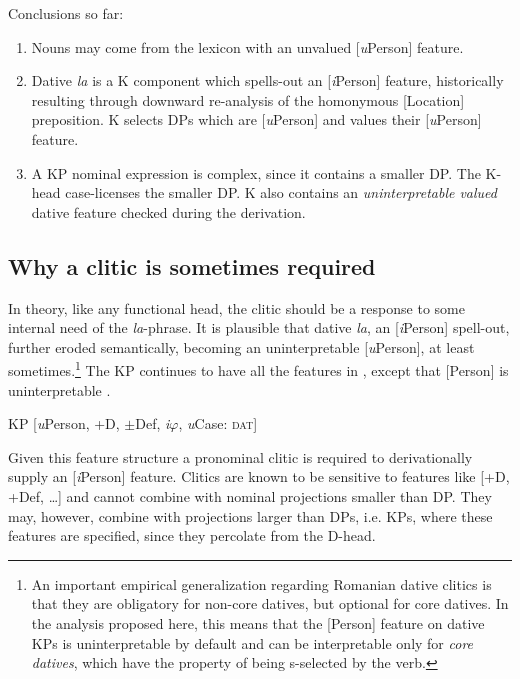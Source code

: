 \documentclass[output=paper,colorlinks,citecolor=brown,nonflat]{langsci/langscibook}
\begin{document}
 {Conclusions} {so} {far}:
 \begin{enumerate}
	\item Nouns may come from the lexicon with an unvalued [\textit{u}Person] feature.
	\item Dative \textit{la} is a K component which spells-out an [\textit{i}Person] feature, historically resulting through downward re-analysis of the homonymous [Location] preposition. K selects DPs which are [\textit{u}Person] and values their [\textit{u}Person] feature.
	\item A KP nominal expression is complex, since it contains a smaller DP. The K-head case-licenses the smaller DP. K also contains an \textit{uninterpretable valued} dative feature checked during the derivation.
	\end{enumerate}

\subsection{Why a clitic is sometimes required}

In theory, like any functional head, the clitic should be a response to some internal need of the \textit{la}-phrase. It is plausible that dative \textit{la}, an [\textit{i}Person] spell-out, further eroded semantically, becoming an uninterpretable [\textit{u}Person], at least sometimes.\footnote{An important empirical generalization \citep{Cornilescu2017} regarding Romanian dative clitics is that they are obligatory for non-core datives, but optional for core datives. In the analysis proposed here, this means that the [Person] feature on dative KPs is uninterpretable by default and can be interpretable only for \textit{core datives}, which have the property of being s-selected by the verb.} The KP continues to have all the features in , except that [Person] is uninterpretable .

\ea%
      \label{ex:cornilescu:17}
      KP [\textit{u}Person, +D, ${\pm}$Def, \textit{i}${\varphi}$, \textit{u}Case: \textsc{dat}]
      \z

Given this feature structure a pronominal clitic is required to derivationally supply an [\textit{i}Person] feature. Clitics are known to be sensitive to features like [+D, +Def, …] and cannot combine with nominal projections smaller than DP. They may, however, combine with projections larger than DPs, i.e. KPs, where these features are specified, since they percolate from the D-head.
\end{document}
